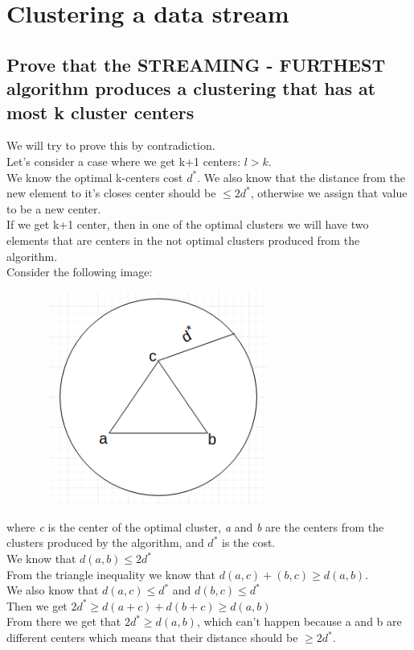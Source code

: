 \documentclass[11pt]{article}
\begin{document}
\section{Clustering a data stream}

\subsection{Prove that the STREAMING - FURTHEST algorithm produces a clustering that has at most k cluster centers}
We will try to prove this by contradiction. \\
Let's consider a case where we get k+1 centers: $ l>k $. \\
We know the optimal k-centers cost $d^*$.
We also know that the distance from the new element to it's closes center should be $ \leq 2d^* $, otherwise we assign that value to be a new center. \\
If we get k+1 center, then in one of the optimal clusters we will have two elements that are centers in the not optimal clusters produced from the algorithm. \\
Consider the following image:

\begin{center}
\includegraphics[width=10cm, height=7cm]{optimal_cluster.png}
\end{center}

where \textit{c} is the center of the optimal cluster, \textit{a} and \textit{b} are the centers from the clusters produced by the algorithm, and $ d^* $ is the cost. \\
We know that $ d(a,b) \leq 2d^* $ \\
From the triangle inequality we know that $ d(a,c) + (b,c) \geq d(a,b) $. \\
We also know that $ d(a,c) \leq d^*$ and $ d(b,c) \leq d^* $ \\
Then we get $ 2d^* \geq d(a+c) + d(b+c) \geq d(a,b) $ \\
From there we get that $ 2d^* \geq d(a,b) $, which can't happen because a and b are different centers which means that their distance should be $ \geq 2d^* $.
\end{document}
